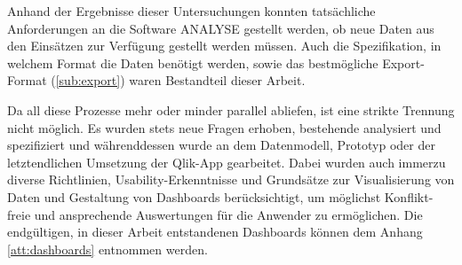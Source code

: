 Anhand der Ergebnisse dieser Untersuchungen konnten tatsächliche Anforderungen an die Software \gls{ANALYSE} gestellt werden, ob neue Daten aus den Einsätzen zur Verfügung gestellt werden müssen.
Auch die Spezifikation, in welchem Format die Daten benötigt werden, 
sowie das bestmögliche Export-Format (\ref{sub:export}) waren Bestandteil dieser Arbeit. 

Da all diese Prozesse mehr oder minder parallel abliefen, ist eine strikte Trennung nicht möglich.
Es wurden stets neue Fragen erhoben, bestehende analysiert und spezifiziert und währenddessen wurde an dem Datenmodell, Prototyp oder der letztendlichen Umsetzung der Qlik-App gearbeitet.
Dabei wurden auch immerzu diverse Richtlinien, Usability-Erkenntnisse und Grundsätze zur Visualisierung von Daten und Gestaltung von Dashboards 
berücksichtigt, um möglichst Konflikt-freie und ansprechende Auswertungen für die Anwender zu ermöglichen.
Die endgültigen, in dieser Arbeit entstandenen Dashboards können dem Anhang \ref{att:dashboards} entnommen werden.



